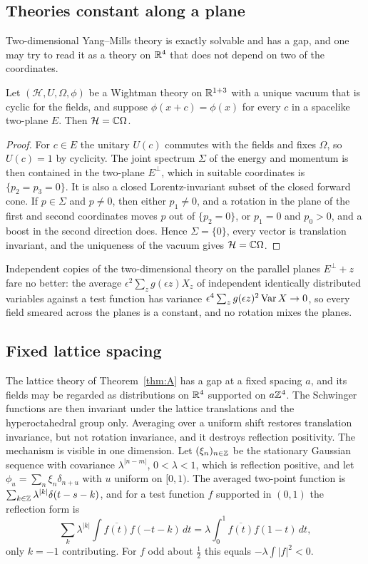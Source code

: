 \subsection{Theories constant along a plane}

Two-dimensional Yang--Mills theory is exactly solvable and has a gap, and one
may try to read it as a theory on $\mathbb{R}^4$ that does not depend on two of the
coordinates.

\begin{proposition}\label{prop:planar}
Let $(\mathcal H,U,\Omega,\phi)$ be a Wightman theory on $\mathbb{R}^{1+3}$ with a
unique vacuum that is cyclic for the fields, and suppose $\phi(x+c)=\phi(x)$
for every $c$ in a spacelike two-plane $E$. Then $\mathcal H=\mathbb{C}\Omega$.
\end{proposition}

\begin{proof}
For $c\in E$ the unitary $U(c)$ commutes with the fields and fixes $\Omega$,
so $U(c)=1$ by cyclicity. The joint spectrum $\Sigma$ of the energy and
momentum is then contained in the two-plane $E^\perp$, which in suitable
coordinates is $\{p_2=p_3=0\}$. It is also a closed Lorentz-invariant subset
of the closed forward cone. If $p\in\Sigma$ and $p\ne0$, then either
$p_1\ne0$, and a rotation in the plane of the first and second coordinates
moves $p$ out of $\{p_2=0\}$, or $p_1=0$ and $p_0>0$, and a boost in the
second direction does. Hence $\Sigma=\{0\}$, every vector is translation
invariant, and the uniqueness of the vacuum gives $\mathcal H=\mathbb{C}\Omega$.
\end{proof}

Independent copies of the two-dimensional theory on the parallel planes
$E^\perp+z$ fare no better: the average $\epsilon^2\sum_zg(\epsilon z)X_z$ of
independent identically distributed variables against a test function has
variance $\epsilon^4\sum_zg(\epsilon z)^2\operatorname{Var} X\to0$, so every field smeared
across the planes is a constant, and no rotation mixes the planes.

\subsection{Fixed lattice spacing}

The lattice theory of Theorem~\ref{thm:A} has a gap at a fixed spacing $a$,
and its fields may be regarded as distributions on $\mathbb{R}^4$ supported on
$a\mathbb{Z}^4$. The Schwinger functions are then invariant under the lattice
translations and the hyperoctahedral group only. Averaging over a uniform
shift restores translation invariance, but not rotation invariance, and it
destroys reflection positivity. The mechanism is visible in one dimension.
Let $(\xi_n)_{n\in\mathbb{Z}}$ be the stationary Gaussian sequence with covariance
$\lambda^{|n-m|}$, $0<\lambda<1$, which is reflection positive, and let
$\phi_u=\sum_n\xi_n\delta_{n+u}$ with $u$ uniform on $[0,1)$. The averaged
two-point function is $\sum_{k\in\mathbb{Z}}\lambda^{|k|}\delta(t-s-k)$, and for a
test function $f$ supported in $(0,1)$ the reflection form is
\[
\sum_{k}\lambda^{|k|}\int\overline{f(t)}f(-t-k)\,dt
=\lambda\int_0^1\overline{f(t)}f(1-t)\,dt,
\]
only $k=-1$ contributing. For $f$ odd about $\frac12$ this equals
$-\lambda\int|f|^2<0$.

